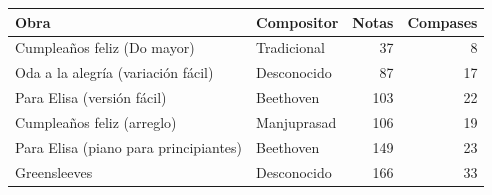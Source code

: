 \begin{tabular}{@{}p{5.5cm}p{2.8cm}rr@{}}
\hline
Obra & Compositor & Notas & Compases \\
\hline
Cumpleaños feliz (Do mayor) & Tradicional & 37 & 8 \\
Oda a la alegría (variación fácil) & Desconocido & 87 & 17 \\
Para Elisa (versión fácil) & Beethoven & 103 & 22 \\
Cumpleaños feliz (arreglo) & Manjuprasad & 106 & 19 \\
Para Elisa (piano para principiantes) & Beethoven & 149 & 23 \\
Greensleeves & Desconocido & 166 & 33 \\
\hline
\end{tabular}
